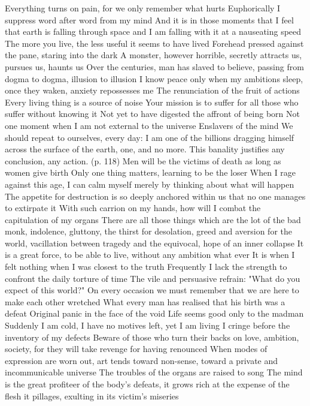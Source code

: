 \documentclass{article}
\begin{document}
Everything turns on pain, for we only remember what hurts
Euphorically I suppress word after word from my mind
And it is in those moments that I feel that earth is falling through space and I am falling with it at a nauseating speed
The more you live, the less useful it seems to have lived
Forehead pressed against the pane, staring into the dark
A monster, however horrible, secretly attracts us, pursues us, haunts us
Over the centuries, man has slaved to believe, passing from dogma to dogma, illusion to illusion
I know peace only when my ambitions sleep, once they waken, anxiety repossesses me
The renunciation of the fruit of actions
Every living thing is a source of noise
Your mission is to suffer for all those who suffer without knowing it
Not yet to have digested the affront of being born
Not one moment when I am not external to the universe
Enslavers of the mind
We should repeat to ourselves, every day: I am one of the billions dragging himself across the surface of the earth, one, and no more. This banality justifies any conclusion, any action. (p. 118)
Men will be the victims of death as long as women give birth
Only one thing matters, learning to be the loser
When I rage against this age, I can calm myself merely by thinking about what will happen
The appetite for destruction is so deeply anchored within us that no one manages to extirpate it
With such carrion on my hands, how will I combat the capitulation of my organs
There are all those things which are the lot of the bad monk, indolence, gluttony, the thirst for desolation, greed and aversion for the world, vacillation between tragedy and the equivocal, hope of an inner collapse
It is a great force, to be able to live, without any ambition what ever
It is when I felt nothing when I was closest to the truth
Frequently I lack the strength to confront the daily torture of time
The vile and persuasive refrain: "What do you expect of this world?"
On every occasion we must remember that we are here to make each other wretched
What every man has realised that his birth was a defeat
Original panic in the face of the void
Life seems good only to the madman
Suddenly I am cold, I have no motives left, yet I am living
I cringe before the inventory of my defects
Beware of those who turn their backs on love, ambition, society, for they will take revenge for having renounced
When modes of expression are worn out, art tends toward non-sense, toward a private and incommunicable universe
The troubles of the organs are raised to song
The mind is the great profiteer of the body's defeats, it grows rich at the expense of the flesh it pillages, exulting in its victim's miseries
\end{document}
